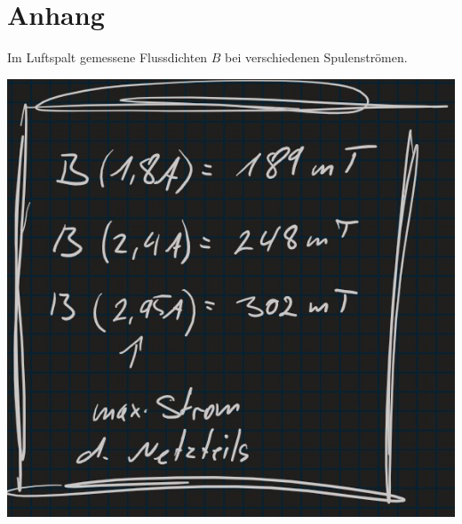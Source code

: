\chapter{Anhang}
\begin{table}[h]
    \centering
    \caption[Messtechnisch ermittelte Flussdichten]{Im Luftspalt gemessene Flussdichten $B$ bei verschiedenen Spulenströmen.}
    \includegraphics[height=.5\textheight]{messungen/messungen_flussdichte.jpg}
    \label{tab:messwerte_flussdichte}
\end{table}

